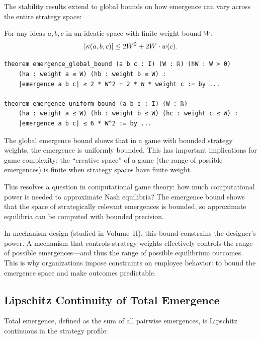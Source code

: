 The stability results extend to global bounds on how emergence can vary across
the entire strategy space:

\begin{theorem}
\label{thm:global-emergence-bound}
For any ideas $a, b, c$ in an ideatic space with finite weight bound $W$:
\[
  |\kappa(a, b, c)| \leq 2W^2 + 2W \cdot w(c).
\]
\end{theorem}

\begin{lstlisting}[caption={Global emergence bound (IDT\_v3\_Emergence.lean)}]
theorem emergence_global_bound (a b c : I) (W : ℝ) (hW : W > 0)
    (ha : weight a ≤ W) (hb : weight b ≤ W) :
    |emergence a b c| ≤ 2 * W^2 + 2 * W * weight c := by ...

theorem emergence_uniform_bound (a b c : I) (W : ℝ)
    (ha : weight a ≤ W) (hb : weight b ≤ W) (hc : weight c ≤ W) :
    |emergence a b c| ≤ 6 * W^2 := by ...
\end{lstlisting}

\begin{interpretation}
The global emergence bound shows that in a game with bounded strategy weights,
the emergence is uniformly bounded. This has important implications for game
complexity: the ``creative space'' of a game (the range of possible emergences)
is finite when strategy spaces have finite weight.

This resolves a question in computational game theory: how much computational
power is needed to approximate Nash equilibria? The emergence bound shows that
the space of strategically relevant emergences is bounded, so approximate
equilibria can be computed with bounded precision.

In mechanism design (studied in Volume~II), this bound constrains the designer's
power. A mechanism that controls strategy weights effectively controls the
range of possible emergences---and thus the range of possible equilibrium
outcomes. This is why organizations impose constraints on employee behavior:
to bound the emergence space and make outcomes predictable.
\end{interpretation}

\subsection{Lipschitz Continuity of Total Emergence}

Total emergence, defined as the sum of all pairwise emergences, is Lipschitz
continuous in the strategy profile:

